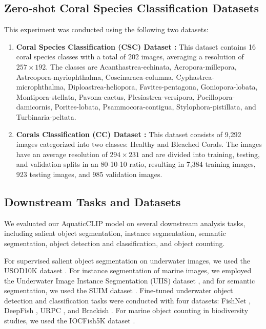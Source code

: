 \subsection{Zero-shot Coral Species Classification Datasets}
This experiment was conducted using the following two datasets:

\begin{enumerate}
    \item \textbf{Coral Species Classification (CSC) Dataset \cite{coral-species-classification_dataset}:} This dataset contains 16 coral species classes with a total of 202 images, averaging a resolution of $257 \times 192$. 
The classes are Acanthastrea-echinata, Acropora-millepora, Astreopora-myriophthalma, Coscinaraea-columna, Cyphastrea-microphthalma, Diploastrea-heliopora, Favites-pentagona, Goniopora-lobata, Montipora-stellata, Pavona-cactus, Plesiastrea-versipora, Pocillopora-damicornis, Porites-lobata, Psammocora-contigua, Stylophora-pistillata, and Turbinaria-peltata.

\item \textbf{Corals Classification (CC) Dataset \cite{coral_classification}:} This dataset consists of 9,292 images categorized into two classes: Healthy and Bleached Corals. 
The images have an average resolution of $294 \times 231$ and are divided into training, testing, and validation splits in an 80-10-10 ratio, resulting in 7,384 training images, 923 testing images, and 985 validation images.

\end{enumerate}


\subsection{Downstream Tasks and Datasets}
We evaluated our AquaticCLIP model on several downstream analysis tasks, including salient object segmentation, instance segmentation, semantic segmentation, object detection and classification, and object counting.

For supervised salient object segmentation on underwater images, we used the USOD10K dataset \cite{usod10k}.
For instance segmentation of marine images, we employed the Underwater Image Instance Segmentation (UIIS) dataset \cite{Lian_2023_ICCV}, and for semantic segmentation, we used the SUIM dataset \cite{islam2020suim}.
Fine-tuned underwater object detection and classification tasks were conducted with four datasets: FishNet \cite{khan2023fishnet}, DeepFish \cite{saleh2020realistic}, URPC \cite{urpc}, and Brackish \cite{Pedersen_2019_CVPR_Workshops}.
For marine object counting in biodiversity studies, we used the IOCFish5K dataset \cite{sun2023indiscernible}.


